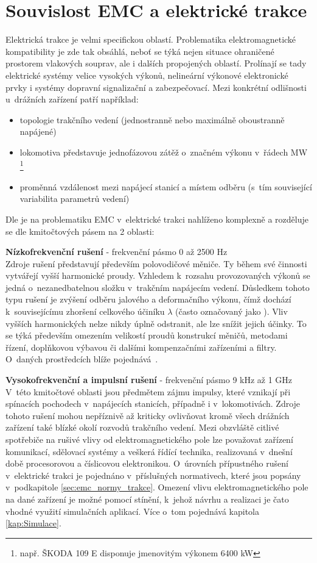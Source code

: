 
\section{Souvislost EMC a elektrické trakce} \label{sec:emc_trakce}
Elektrická trakce je velmi specifickou oblastí. Problematika elektromagnetické kompatibility je zde tak obsáhlá, neboť se týká nejen situace ohraničené prostorem vlakových souprav, ale i dalších propojených oblastí. Prolínají se tady elektrické systémy velice vysokých výkonů, nelineární výkonové elektronické prvky i systémy dopravní signalizační a zabezpečovací. Mezi konkrétní odlišnosti u~drážních zařízení patří například:
\begin{itemize}
\item topologie trakčního vedení (jednostranně nebo maximálně oboustranně napájené)
\item lokomotiva představuje jednofázovou zátěž o~značném výkonu v~řádech MW \footnote{např. ŠKODA 109 E disponuje jmenovitým výkonem 6400 kW}
\item proměnná vzdálenost mezi napájecí stanicí a místem odběru (s~tím související variabilita parametrů vedení)
\end{itemize}
Dle \cite{emc_trakce} je na problematiku EMC v~elektrické trakci nahlíženo komplexně a rozděluje se dle kmitočtových pásem na 2 oblasti:

\medskip
{\bf Nízkofrekvenční rušení} - frekvenční pásmo 0 až 2500 Hz \\
Zdroje rušení představují především polovodičové měniče. Ty během své činnosti vytvářejí vyšší harmonické proudy. Vzhledem k~rozsahu provozovaných výkonů se jedná o~nezanedbatelnou složku v~trakčním napájecím vedení. Důsledkem tohoto typu rušení je zvýšení odběru jalového a deformačního výkonu, čímž dochází k~souvisejícímu zhoršení celkového účiníku $\lambda$ (často označovaný jako ). Vliv vyšších harmonických nelze nikdy úplně odstranit, ale lze snížit jejich účinky. To se týká především omezením velikostí proudů konstrukcí měničů, metodami řízení, doplňkovou výbavou či dalšími kompenzačními zařízeními a filtry. O~daných prostředcích blíže pojednává~\cite{nfr}.

\medskip
{\bf Vysokofrekvenční a impulsní rušení} - frekvenční pásmo 9 kHz až 1 GHz \\
V~této kmitočtové oblasti jsou předmětem zájmu impulsy, které vznikají při spínacích pochodech v~napájecích stanicích, případně i v~lokomotivách. Zdroje tohoto rušení mohou nepříznivě až kriticky ovlivňovat kromě všech drážních zařízení také blízké okolí rozvodů trakčního vedení. Mezi obzvláště citlivé spotřebiče na rušivé vlivy od elektromagnetického pole lze považovat zařízení komunikací, sdělovací systémy a veškerá řídící technika, realizovaná v~dnešní době procesorovou a číslicovou elektronikou. O~úrovních přípustného rušení v~elektrické trakci je pojednáno v~příslušných normativech, které jsou popsány v~podkapitole \ref{sec:emc_normy_trakce}. Omezení vlivu elektromagnetického pole na dané zařízení je možné pomocí stínění, k~jehož návrhu a realizaci je čato vhodné využití simulačních aplikací. Více o~tom pojednává kapitola \ref{kap:Simulace}.
\newpage

